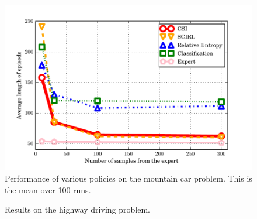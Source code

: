 \documentclass{llncs}
\begin{document}
\begin{figure}
  \center
  \includegraphics[width=.71\textwidth]{Exp11.pdf}
  \caption{Performance of various policies on the mountain car problem. This is the mean over 100 runs.}
  \label{fig:MountainCar}
\end{figure}


  \begin{figure}
  \caption{Results on the highway driving problem.}
  \label{fig:Highway}
  
\end{figure}
\end{document}

